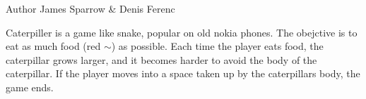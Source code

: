 \begin{DoxyAuthor}{Author}
James Sparrow \& Denis Ferenc
\end{DoxyAuthor}
Caterpiller is a game like snake, popular on old nokia phones. The obejctive is to eat as much food (red $\sim$) as possible. Each time the player eats food, the caterpillar grows larger, and it becomes harder to avoid the body of the caterpillar. If the player moves into a space taken up by the caterpillar\textquotesingle{}s body, the game ends. 
